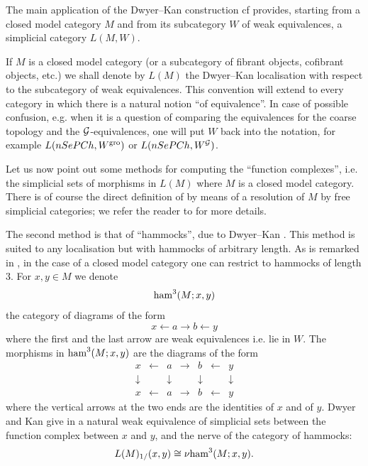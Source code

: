 The main application of the Dwyer--Kan construction cf \cite{DwyerKan2}
provides, starting from a
closed model category $M$ and from its
subcategory $W$ of weak equivalences, a simplicial
category $L(M,W)$.

\begin{convention}
\label{convenir}
If $M$ is a closed model category
(or a subcategory of fibrant objects, cofibrant objects, etc.) we shall denote
by $L(M)$ the Dwyer--Kan localisation with respect to the subcategory of
weak equivalences. This convention will extend to every category in
which there is a natural notion ``of equivalence''. In case of possible
confusion, e.g. when it is a question of comparing the equivalences for the
coarse topology and the ${\cal G}$-equivalences, one will put $W$ back into the
notation, for example $L(nSePCh, W^{\rm gro})$ or $L(nSePCh, W^{{\cal G}})$.
\end{convention}



Let us now point out some methods for computing the ``function complexes'',
i.e. the simplicial sets of morphisms in $L(M)$ where $M$
is a closed model category.
There is of course the direct definition of \cite{DwyerKan1} by means of a
resolution of $M$ by free simplicial categories;
we refer the
reader to \cite{DwyerKan1} for more details.

The second method is that of
``hammocks'', due to Dwyer--Kan \cite{DwyerKan2}. This method is suited to any
localisation but with hammocks of arbitrary length. As is remarked
in \cite{DwyerKan2}, in the case of a closed model category one
can restrict to hammocks of length $3$. For $x,y\in M$ we denote
$$
{\rm ham}^3(M; x,y)
$$
the category of diagrams of the form
$$
x\leftarrow a\rightarrow b \leftarrow y
$$
where the first and the last arrow are weak equivalences
i.e. lie in $W$. The morphisms in ${\rm ham}^3(M; x,y)$
are the diagrams of the form
$$
\begin{array}{ccccccc}
x&\leftarrow &a&\rightarrow &b& \leftarrow &y\\
\downarrow &&\downarrow &&\downarrow && \downarrow \\
x&\leftarrow &a&\rightarrow &b& \leftarrow &y
\end{array}
$$
where the vertical arrows at the two ends are the identities of $x$ and
of $y$.
Dwyer and Kan give in \cite{DwyerKan2} a natural weak equivalence
of simplicial sets between the function complex between $x$ and
$y$, and the nerve of the category of hammocks:
$$
L(M)_{1/}(x,y) \cong \nu  {\rm ham}^3(M; x,y).
$$

